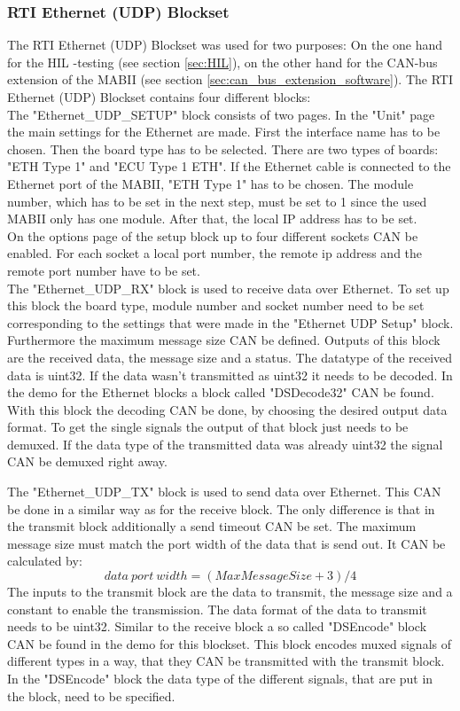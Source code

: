 \documentclass[ExampleMasters.tex]{subfiles}
\begin{document}
\subsubsection{RTI Ethernet (UDP) Blockset}
The \gls{RTI} Ethernet (\gls{UDP}) Blockset was used for two purposes: On the one hand for the \gls{HIL} -testing (see section \ref{sec:HIL}), on the other hand for the \gls{CAN}-bus extension of the \gls{MABII} (see section \ref{sec:can_bus_extension_software}). The \gls{RTI} Ethernet (UDP) Blockset contains four different blocks:\\
The "Ethernet\_UDP\_SETUP" block consists of two pages. In the "Unit" page the main settings for the Ethernet are made. First the interface name has to be chosen. Then the board type has to be selected. There are two types of boards: "ETH Type 1" and "ECU Type 1 ETH". If the Ethernet cable is connected to the Ethernet port of the \gls{MABII}, "ETH Type 1" has to be chosen. The module number, which has to be set in the next step, must be set to 1 since the used \gls{MABII} only has one module.
After that, the local \gls{IP} address has to be set.\\
On the options page of the setup block up to four different sockets \gls{CAN} be enabled. For each socket a local port number, the remote ip address and the remote port number have to be set.\\
 
The "Ethernet\_UDP\_RX" block is used to receive data over Ethernet. To set up this block the board type, module number and socket number need to be set corresponding to the settings that were made in the "Ethernet \gls{UDP} Setup" block. Furthermore the maximum message size \gls{CAN} be defined. Outputs of this block are the received data, the message size and a status. The datatype of the received data is uint32. If the data wasn't transmitted as uint32 it needs to be decoded. In the demo for the Ethernet blocks a block called "DSDecode32" \gls{CAN} be found. With this block the decoding \gls{CAN} be done, by choosing the desired output data format. To get the single signals the output of that block just needs to be demuxed. If the data type of the transmitted data was already uint32 the signal \gls{CAN} be demuxed right away.

The "Ethernet\_UDP\_TX" block is used to send data over Ethernet. This \gls{CAN} be done in a similar way as for the receive block. The only difference is that in the transmit block additionally a send timeout \gls{CAN} be set. The maximum message size must match the port width of the data that is send out. It \gls{CAN} be calculated by:
\begin{equation}
data\ port\ width=(MaxMessageSize + 3) / 4
\end{equation}
The inputs to the transmit block are the data to transmit, the message size and a constant to enable the transmission. The data format of the data to transmit needs to be uint32. Similar to the receive block a so called "DSEncode" block \gls{CAN} be found in the demo for this blockset. This block encodes muxed signals of different types in a way, that they \gls{CAN} be transmitted with the transmit block. In the "DSEncode" block the data type of the different signals, that are put in the block, need to be specified.
\end{document}

